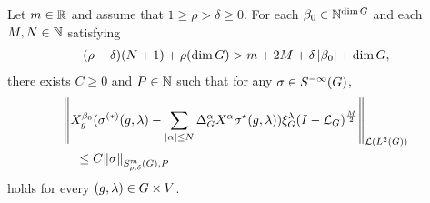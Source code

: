 \begin{lemma}
\label{lemma:prepare_adjoint_formula}
    Let $m \in \mathbb{R}$ and
    assume that $1 \geq \rho > \delta \geq 0$.
    For each $\beta_0 \in \mathbb{N}^{\dim G}$ and each $M, N \in \mathbb{N}$ satisfying
    \begin{align*}
        (\rho - \delta) (N + 1) + \rho (\dim G)
        > m + 2 M + \delta \left|{\beta_0}\right| + \dim G,
    \end{align*}
    there exists $C \geq 0$ and $P \in \mathbb{N}$ such that for any $\sigma \in {S^{-\infty} (G)}$,
    \begin{align*}
        &\norm [\Lin {\Lebesgue 2 \Group}] {%
        \LeftDifferentialOperator [g] {\beta_0} (
            \sigma^{(*)}(g,\lambda)
            - \sum_{\abs \alpha \leq N} \DifferenceOperatorOrder \alpha \LeftDifferentialOperator \alpha \adj \sigma(g, \lambda))
            \Rep \lambda \BesselPotential M
        }\\
        &\quad \leq C \SymbolSemiNorm m {\rho, \delta} P \sigma
    \end{align*}
    holds for every $(g, \lambda) \in G \times V$.
\end{lemma}
